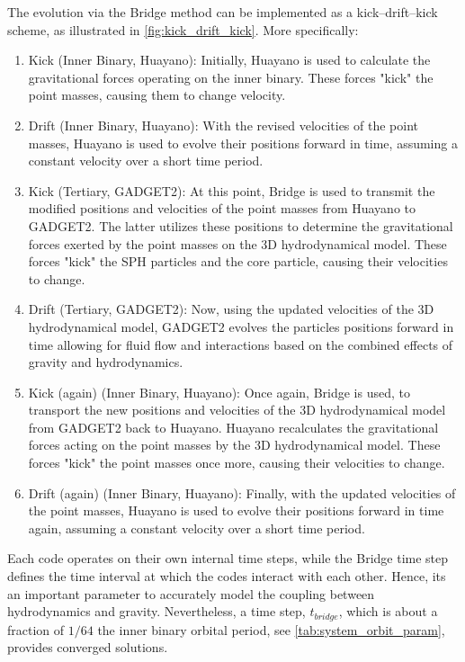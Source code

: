 The evolution via the Bridge method can be implemented as a kick–drift–kick scheme, as illustrated in \cref{fig:kick_drift_kick}. More specifically:
\begin{enumerate}
    \item Kick (Inner Binary, Huayano): Initially, Huayano is used to calculate the gravitational forces operating on the inner binary. These forces "kick" the point masses, causing them to change velocity.
    \item Drift (Inner Binary, Huayano): With the revised velocities of the point masses, Huayano is used to evolve their positions forward in time, assuming a constant velocity over a short time period.
    \item Kick (Tertiary, GADGET2): At this point, Bridge is used to transmit the modified positions and velocities of the point masses from Huayano to GADGET2. The latter utilizes these positions to determine the gravitational forces exerted by the point masses on the 3D hydrodynamical model. These forces "kick" the SPH particles and the core particle, causing their velocities to change.
    \item Drift (Tertiary, GADGET2): Now, using the updated velocities of the 3D hydrodynamical model, GADGET2 evolves the particles positions forward in time allowing for fluid flow and interactions based on the combined effects of gravity and hydrodynamics.
    \item Kick (again) (Inner Binary, Huayano): Once again, Bridge is used, to transport the new positions and velocities of the 3D hydrodynamical model from GADGET2 back to Huayano. Huayano recalculates the gravitational forces acting on the point masses by the 3D hydrodynamical model. These forces "kick" the point masses once more, causing their velocities to change.
    \item Drift (again) (Inner Binary, Huayano): Finally, with the updated velocities of the point masses, Huayano is used to evolve their positions forward in time again, assuming a constant velocity over a short time period.
\end{enumerate}

Each code operates on their own internal time steps, while the Bridge time step  defines the time interval at which the codes interact with each other. Hence, its an important parameter to 
accurately model the coupling between hydrodynamics and gravity. Nevertheless, a time step, $t_{bridge}$, which is about a fraction of $1/64$ the inner binary orbital period, see \cref{tab:system_orbit_param}, provides converged solutions. 

